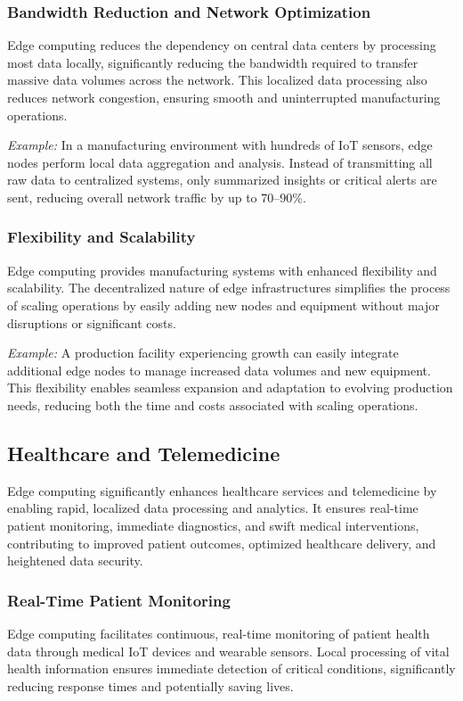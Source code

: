 \documentclass[runningheads]{llncs}
\begin{document}
\subsubsection{Bandwidth Reduction and Network Optimization}
Edge computing reduces the dependency on central data centers by processing most data locally, significantly reducing the bandwidth required to transfer massive data volumes across the network. This localized data processing also reduces network congestion, ensuring smooth and uninterrupted manufacturing operations.

\textit{Example:} In a manufacturing environment with hundreds of IoT sensors, edge nodes perform local data aggregation and analysis. Instead of transmitting all raw data to centralized systems, only summarized insights or critical alerts are sent, reducing overall network traffic by up to 70–90\%.

\subsubsection{Flexibility and Scalability}
Edge computing provides manufacturing systems with enhanced flexibility and scalability. The decentralized nature of edge infrastructures simplifies the process of scaling operations by easily adding new nodes and equipment without major disruptions or significant costs.

\textit{Example:} A production facility experiencing growth can easily integrate additional edge nodes to manage increased data volumes and new equipment. This flexibility enables seamless expansion and adaptation to evolving production needs, reducing both the time and costs associated with scaling operations.


\subsection{Healthcare and Telemedicine}

Edge computing significantly enhances healthcare services and telemedicine by enabling rapid, localized data processing and analytics. It ensures real-time patient monitoring, immediate diagnostics, and swift medical interventions, contributing to improved patient outcomes, optimized healthcare delivery, and heightened data security.

\subsubsection{Real-Time Patient Monitoring}
Edge computing facilitates continuous, real-time monitoring of patient health data through medical IoT devices and wearable sensors. Local processing of vital health information ensures immediate detection of critical conditions, significantly reducing response times and potentially saving lives.
\end{document}
